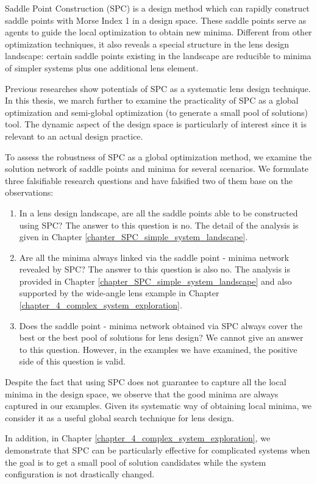 Saddle Point Construction (SPC) is a design method which can rapidly construct saddle points with Morse Index 1 in a design space. These saddle points serve as agents to guide the local optimization to obtain new minima. Different from other optimization techniques, it also reveals a special structure in the lens design landscape: certain saddle points existing in the landscape are reducible to minima of simpler systems plus one additional lens element.

Previous researches show potentials of SPC as a systematic lens design technique. In this thesis, we march further to examine the practicality of SPC as a global optimization and semi-global optimization (to generate a small pool of solutions) tool. The dynamic aspect of the design space is particularly of interest since it is relevant to an actual design practice. 

To assess the robustness of SPC as a global optimization method, we examine the solution network of saddle points and minima for several scenarios. We formulate three falsifiable research questions and have falsified two of them base on the observations:
\begin{enumerate}[nosep]
\item In a lens design landscape, are all the saddle points able to be constructed using SPC? The answer to this question is no. The detail of the analysis is given in Chapter \ref{chapter_SPC_simple_system_landscape}.
\item Are all the minima always linked via the saddle point - minima network revealed by SPC? The answer to this question is also no. The analysis is provided in Chapter \ref{chapter_SPC_simple_system_landscape} and also supported by the wide-angle lens example in Chapter \ref{chapter_4_complex_system_exploration}.
\item Does the saddle point - minima network obtained via SPC always cover the best or the best pool of solutions for lens design? We cannot give an answer to this question. However, in the examples we have examined, the positive side of this question is valid. 
\end{enumerate}

Despite the fact that using SPC does not guarantee to capture all the local minima in the design space, we observe that the good minima are always captured in our examples. Given its systematic way of obtaining local minima, we consider it as a useful global search technique for lens design. 

In addition, in Chapter \ref{chapter_4_complex_system_exploration}, we demonstrate that SPC can be particularly effective for complicated systems when the goal is to get a small pool of solution candidates while the system configuration is not drastically changed. 

